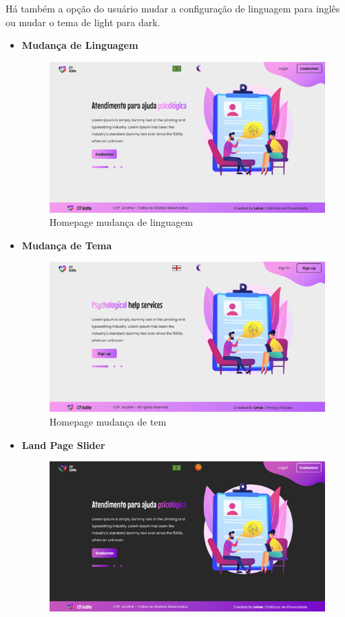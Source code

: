 \documentclass[12pt,a4paper]{article}
\begin{document}
Há também a opção do usuário mudar a configuração de linguagem para inglês ou mudar o tema de light para dark.

\begin{itemize}
    \item \textbf{Mudança de Linguagem}
        \begin{figure}[H]
            \centering
            \includegraphics[width=15cm]{prot.png}
            \caption{Homepage mudança de linguagem}
        \end{figure}
    \item \textbf{Mudança de Tema}
        \begin{figure}[H]
            \centering
            \includegraphics[width=15cm]{prot2.png}
            \caption{Homepage mudança de tem}
        \end{figure}
    \item \textbf{Land Page Slider}
        \begin{figure}[H]
            \centering
            \includegraphics[width=15cm]{prot3.png}

\end{figure}
\end{itemize}
\end{document}
